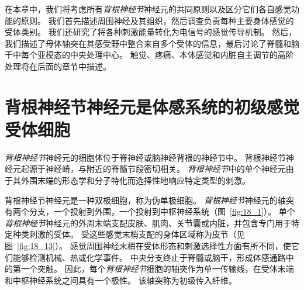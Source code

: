 在本章中，我们将考虑所有\textit{背根神经节}神经元的共同原则以及区分它们各自感觉功能的原则。
我们首先描述周围神经及其组织，然后调查负责每种主要身体感觉的受体类别。
我们还研究了将各种刺激能量转化为电信号的感觉传导机制。
然后，我们描述了母体轴突在其感受野中整合来自多个受体的信息，最后讨论了脊髓和脑干中每个亚模态的中央处理中心。
触觉、疼痛、本体感觉和内脏自主调节的高阶处理将在后面的章节中描述。



\section{背根神经节神经元是体感系统的初级感觉受体细胞}

\textit{背根神经节}神经元的细胞体位于脊神经或脑神经背根的神经节中。
背根神经节神经元起源于神经嵴，与附近的脊髓节段密切相关。
\textit{背根神经节}中的单个神经元由于其外围末端的形态学和分子特化而选择性地响应特定类型的刺激。


背根神经节神经元是一种双极细胞，称为伪单极细胞。 
\textit{背根神经节}神经元的轴突有两个分支，一个投射到外围，一个投射到中枢神经系统（图~\ref{fig:18_1}）。
单个\textit{背根神经节}神经元的外周末端支配皮肤、肌肉、关节囊或内脏，并包含专门用于特定种类刺激的受体。 
受这些感觉末梢支配的身体区域称为皮节（见图~\ref{fig:18_13}）。
感觉周围神经末梢在受体形态和刺激选择性方面有所不同，使它们能够检测机械、热或化学事件。
中央分支终止于脊髓或脑干，形成体感通路中的第一个突触。
因此，每个\textit{背根神经节}细胞的轴突作为单一传输线，在受体末端和中枢神经系统之间具有一个极性。
该轴突称为初级传入纤维。


